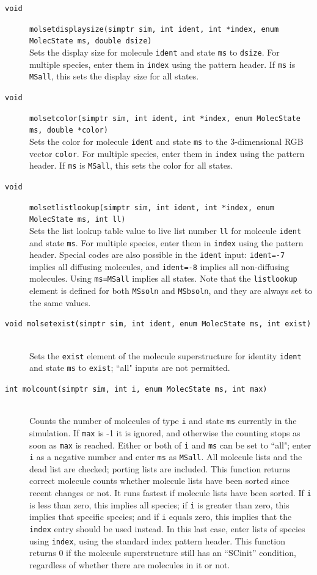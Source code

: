 \documentclass {scrbook}
\newcommand {\ttt} {\texttt}
\begin{document}
\begin{description}
\item[\ttt{void}]
\ttt{molsetdisplaysize(simptr sim, int ident, int *index, enum MolecState ms, double dsize)}
\hfill \\
Sets the display size for molecule \ttt{ident} and state \ttt{ms} to \ttt{dsize}. For multiple species, enter them in \ttt{index} using the pattern header. If \ttt{ms} is \ttt{MSall}, this sets the display size for all states.

\item[\ttt{void}]
\ttt{molsetcolor(simptr sim, int ident, int *index, enum MolecState ms, double *color)}
\hfill \\
Sets the color for molecule \ttt{ident} and state \ttt{ms} to the 3-dimensional RGB vector \ttt{color}. For multiple species, enter them in \ttt{index} using the pattern header. If \ttt{ms} is \ttt{MSall}, this sets the color for all states.

\item[\ttt{void}]
\ttt{molsetlistlookup(simptr sim, int ident, int *index, enum MolecState ms, int ll)}
\hfill \\
Sets the list lookup table value to live list number \ttt{ll} for molecule \ttt{ident} and state \ttt{ms}. For multiple species, enter them in \ttt{index} using the pattern header. Special codes are also possible in the \ttt{ident} input: \ttt{ident=-7} implies all diffusing molecules, and \ttt{ident=-8} implies all non-diffusing molecules. Using \ttt{ms=MSall} implies all states. Note that the \ttt{listlookup} element is defined for both \ttt{MSsoln} and \ttt{MSbsoln}, and they are always set to the same values.

\item[\ttt{void molsetexist(simptr sim, int ident, enum MolecState ms, int exist)}]
\hfill \\
Sets the \ttt{exist} element of the molecule superstructure for identity \ttt{ident} and state \ttt{ms} to \ttt{exist}; ``all" inputs are not permitted.

\item[\ttt{int molcount(simptr sim, int i, enum MolecState ms, int max)}]
\hfill \\
Counts the number of molecules of type \ttt{i} and state \ttt{ms} currently in the simulation. If \ttt{max} is -1 it is ignored, and otherwise the counting stops as soon as \ttt{max} is reached. Either or both of \ttt{i} and \ttt{ms} can be set to ``all"; enter \ttt{i} as a negative number and enter \ttt{ms} as \ttt{MSall}. All molecule lists and the dead list are checked; porting lists are included. This function returns correct molecule counts whether molecule lists have been sorted since recent changes or not. It runs fastest if molecule lists have been sorted. If \ttt{i} is less than zero, this implies all species; if \ttt{i} is greater than zero, this implies that specific species; and if \ttt{i} equals zero, this implies that the \ttt{index} entry should be used instead. In this last case, enter lists of species using \ttt{index}, using the standard index pattern header. This function returns 0 if the molecule superstructure still has an ``SCinit'' condition, regardless of whether there are molecules in it or not.


\end{description}
\end{document}
